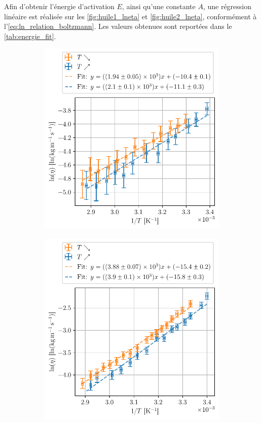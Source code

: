 Afin d'obtenir l'énergie d'activation \(E\), ainsi qu'une constante \(A\), une régression linéaire est réalisée sur les \autoref{fig:huile1_lneta} et \autoref{fig:huile2_lneta}, conformément à l'\autoref{eq:ln_relation_boltzmann}. Les valeurs obtenues sont reportées dans le \autoref{tab:energie_fit}.

\begin{figure}[h]
    \centering
    \begin{subfigure}{0.48\linewidth}
        \centering
        \includegraphics[width=\linewidth]{figures/huile1_lneta.pdf}
        \caption{}
        \label{fig:huile1_lneta}
    \end{subfigure}
    \begin{subfigure}{0.48\linewidth}
        \centering
        \includegraphics[width=\linewidth]{figures/huile2_lneta.pdf}

\end{subfigure}
\end{figure}

